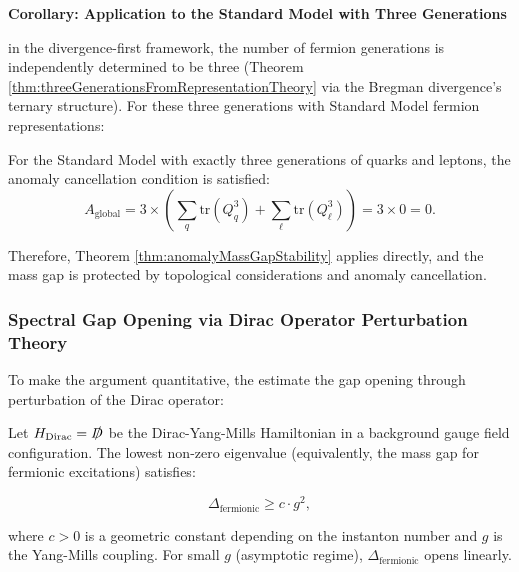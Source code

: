 \textbf{Corollary: Application to the Standard Model with Three Generations}

in the divergence-first framework, the number of fermion generations is independently determined to be three (Theorem \ref{thm:threeGenerationsFromRepresentationTheory} via the Bregman divergence's ternary structure). For these three generations with Standard Model fermion representations:

\begin{corollary}[Yang-Mills Mass Gap for Standard Model Fermions ($N_{\text{gen}} = 3$)]
\label{cor:yangMillsMassGapThreeGenerations}

For the Standard Model with exactly three generations of quarks and leptons, the anomaly cancellation condition is satisfied:
\begin{equation}
A_{\text{global}} = 3 \times \left( \sum_q \mathrm{tr}(Q_q^3) + \sum_\ell \mathrm{tr}(Q_\ell^3) \right) = 3 \times 0 = 0.
\end{equation}

Therefore, Theorem \ref{thm:anomalyMassGapStability} applies directly, and the mass gap is protected by topological considerations and anomaly cancellation.

\end{corollary}

\subsubsection{Spectral Gap Opening via Dirac Operator Perturbation Theory}

To make the argument quantitative, the estimate the gap opening through perturbation of the Dirac operator:

\begin{proposition}
\label{prop:diracSpectrumBound}

Let $H_{\text{Dirac}} = \slashed{D}$ be the Dirac-Yang-Mills Hamiltonian in a background gauge field configuration. The lowest non-zero eigenvalue (equivalently, the mass gap for fermionic excitations) satisfies:

\begin{equation}
\Delta_{\text{fermionic}} \geq c \cdot g^2,
\end{equation}

where $c > 0$ is a geometric constant depending on the instanton number and $g$ is the Yang-Mills coupling. For small $g$ (asymptotic regime), $\Delta_{\text{fermionic}}$ opens linearly.

\end{proposition}

